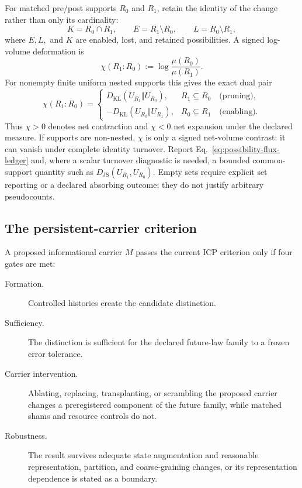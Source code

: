 For matched pre/post supports $R_0$ and $R_1$, retain the identity of the
change rather than only its cardinality:
\begin{equation}
 K=R_0\cap R_1,\qquad
 E=R_1\setminus R_0,\qquad
 L=R_0\setminus R_1,
 \label{eq:possibility-flux-ledger}
\end{equation}
where $E,L,$ and $K$ are enabled, lost, and retained possibilities. A signed
log-volume deformation is
\begin{equation}
 \chi(R_1:R_0):=\log\frac{\mu(R_0)}{\mu(R_1)}.
 \label{eq:signed-support-deformation}
\end{equation}
For nonempty finite uniform nested supports this gives the exact dual pair
\begin{equation}
 \chi(R_1:R_0)=
 \begin{cases}
 D_{\mathrm{KL}}(U_{R_1}\Vert U_{R_0}),&R_1\subseteq R_0
 \quad\text{(pruning)},\\[3pt]
 -D_{\mathrm{KL}}(U_{R_0}\Vert U_{R_1}),&R_0\subseteq R_1
 \quad\text{(enabling)}.
 \end{cases}
 \label{eq:signed-kl-duality}
\end{equation}
Thus $\chi>0$ denotes net contraction and $\chi<0$ net expansion under the
declared measure. If supports are non-nested, $\chi$ is only a signed net-volume
contrast: it can vanish under complete identity turnover. Report
Eq.~\eqref{eq:possibility-flux-ledger} and, where a scalar turnover diagnostic
is needed, a bounded common-support quantity such as
$D_{\mathrm{JS}}(U_{R_1},U_{R_0})$. Empty sets require explicit set reporting
or a declared absorbing outcome; they do not justify arbitrary pseudocounts.

\subsection{The persistent-carrier criterion}

A proposed informational carrier $M$ passes the current ICP criterion only if
four gates are met:
\begin{description}
  \item[Formation.] Controlled histories create the candidate distinction.
  \item[Sufficiency.] The distinction is sufficient for the declared future-law
  family to a frozen error tolerance.
  \item[Carrier intervention.] Ablating, replacing, transplanting, or scrambling
  the proposed carrier changes a preregistered component of the future family,
  while matched shams and resource controls do not.
  \item[Robustness.] The result survives adequate state augmentation and
  reasonable representation, partition, and coarse-graining changes, or its
  representation dependence is stated as a boundary.
\end{description}


